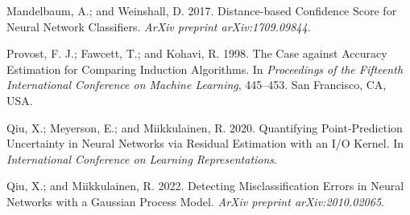 \documentclass{article}
\begin{document}
\begin{thebibliography}{9}

Mandelbaum, A.; and Weinshall, D. 2017.
Distance-based Confidence Score for Neural Network Classifiers.
\textit{ArXiv preprint arXiv:1709.09844}.

Provost, F. J.; Fawcett, T.; and Kohavi, R. 1998.
The Case against Accuracy Estimation for Comparing Induction Algorithms.
In \textit{Proceedings of the Fifteenth International Conference on Machine Learning}, 445--453. San Francisco, CA, USA.

Qiu, X.; Meyerson, E.; and Miikkulainen, R. 2020.
Quantifying Point-Prediction Uncertainty in Neural Networks via Residual Estimation with an I/O Kernel.
In \textit{International Conference on Learning Representations}.

Qiu, X.; and Miikkulainen, R. 2022.
Detecting Misclassification Errors in Neural Networks with a Gaussian Process Model.
\textit{ArXiv preprint arXiv:2010.02065}.

\end{thebibliography}
\end{document}
